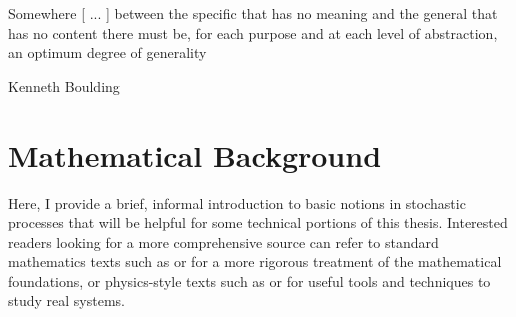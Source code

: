 \epigraph{\justifying Somewhere [ ... ] between the specific that has no meaning and the general that has no content there must be, for each purpose and at each level of abstraction, an optimum degree of generality}{Kenneth Boulding}

\section{Mathematical Background}\label{sec_math_background}

Here, I provide a brief, informal introduction to basic notions in stochastic processes that will be helpful for some technical portions of this thesis. Interested readers looking for a more comprehensive source can refer to standard mathematics texts such as \cite{oksendal_stochastic_1998} or \cite{karatzas_brownian_1998} for a more rigorous treatment of the mathematical foundations, or physics-style texts such as \cite{gardiner_stochastic_2009} or \cite{van_kampen_stochastic_1981} for useful tools and techniques to study real systems.

